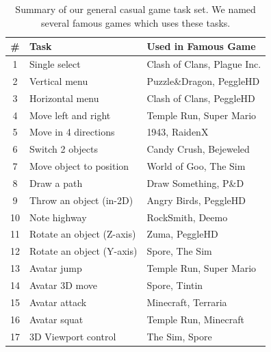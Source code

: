 \documentclass{sigchi}
\newcommand\tabhead[1]{\small\textbf{#1}}
\begin{document}
  \begin{table}
    \centering
    \begin{tabular}{|c|l|l|}
      \hline
      \tabhead{\#} &
      \multicolumn{1}{|p{0.4\columnwidth}|}{\centering\tabhead{Task}} &
      \multicolumn{1}{|p{0.4\columnwidth}|}{\centering\tabhead{Used in Famous Game}} \\
      \hline
      1 & Single select & Clash of Clans, Plague Inc.\\
      \hline
      2 & Vertical menu & Puzzle\&Dragon, PeggleHD \\
      \hline
      3 & Horizontal menu & Clash of Clans, PeggleHD\\
      \hline
      4 & Move left and right & Temple Run, Super Mario\\
      \hline
      5 & Move in 4 directions & 1943, RaidenX\\
      \hline
      6 & Switch 2 objects & Candy Crush, Bejeweled\\
      \hline
      7 & Move object to position & World of Goo, The Sim\\
      \hline
      8 & Draw a path & Draw Something, P\&D\\
      \hline
      9 & Throw an object (in-2D) & Angry Birds, PeggleHD\\
      \hline
      10 & Note highway & RockSmith, Deemo\\
      \hline
      11 & Rotate an object (Z-axis) & Zuma, PeggleHD \\
      \hline
      12 & Rotate an object (Y-axis) & Spore, The Sim\\
      \hline
      13 & Avatar jump & Temple Run, Super Mario\\
      \hline
      14 & Avatar 3D move & Spore, Tintin\\
      \hline
      15 & Avatar attack & Minecraft, Terraria\\
      \hline
      16 & Avatar squat & Temple Run, Minecraft\\
      \hline
      17 & 3D Viewport control & The Sim, Spore\\
      \hline

    \end{tabular}
    \caption{Summary of our general casual game task set. We named several famous games which uses these tasks.}
    \label{tab:table1}
  \end{table}
\end{document}
